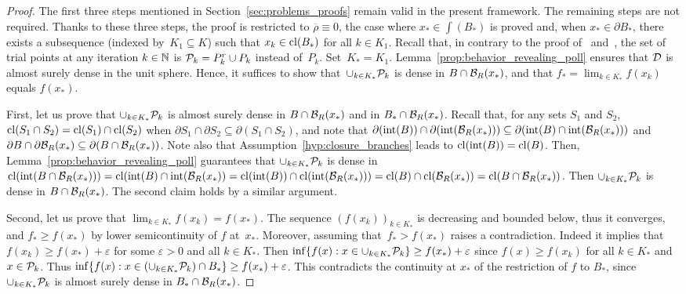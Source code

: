 \begin{proof}
	The first three steps mentioned in Section~\ref{sec:problems_proofs} remain valid in the present framework.
    The remaining steps are not required.
	Thanks to these three steps, the proof is restricted to $\overline{\rho} \equiv 0$, the case where $x_* \in \int(B_*)$ is proved and, when $x_* \in \partial B_*$, there exists a subsequence (indexed by~$K_1 \subseteq K$) such that $x_k \in \cl(B_*)$ for all $k \in K_1$.
	Recall that, in contrary to the proof of~\cite[Theorem~4.1]{ViCu2012} and~\cite[Corollary~4.1]{ViCu2012}, the set of trial points at any iteration $k \in \N$ is $\P_k = P^r_k \cup P_k$ instead of~$P_k$.
    Set~$K_* = K_1$.
	Lemma~\ref{prop:behavior_revealing_poll} ensures that $\D$ is almost surely dense in the unit sphere.
    Hence, it suffices to show that~$\cup_{k \in K_*}\P_k$ is dense in $B \cap \B_R(x_*)$, and that $f_* = \lim_{k \in K_*} f(x_k)$ equals $f(x_*)$.
    
    First, let us prove that $\cup_{k \in K_*}\P_k$ is almost surely dense in $B \cap \B_R(x_*)$ and in $B_* \cap \B_R(x_*)$.
    Recall that, for any sets $S_1$ and $S_2$, $\cl(S_1 \cap S_2) = \cl(S_1) \cap \cl(S_2)$ when $\partial S_1 \cap \partial S_2 \subseteq \partial(S_1 \cap S_2)$, and note that $\partial(\int(B)) \cap \partial(\int(\B_R(x_*))) \subseteq \partial(\int(B) \cap\int(\B_R(x_*)))$ and $\partial B \cap \partial \B_R(x_*) \subseteq \partial(B \cap \B_R(x_*))$.
    Note also that Assumption~\ref{hyp:closure_branches} leads to $\cl(\int(B)) = \cl(B)$.
    Then, Lemma~\ref{prop:behavior_revealing_poll} guarantees that $\cup_{k \in K_*} \P_k$ is dense in $\cl(\int(B \cap \B_R(x_*))) = \cl(\int(B) \cap \int(\B_R(x_*)) = \cl(\int(B)) \cap \cl(\int(\B_R(x_*))) = \cl(B) \cap \cl(\B_R(x_*)) = \cl(B \cap \B_R(x_*))$.
    Then $\cup_{k \in K_*} \P_k$ is dense in $B \cap \B_R(x_*)$.
    The second claim holds by a similar argument.
    
	Second, let us prove that $\lim_{k \in K_*}f(x_k) = f(x_*)$.
    The sequence $(f(x_k))_{k \in K_*}$ is decreasing and bounded below, thus it converges, and $f_* \geq f(x_*)$ by lower semicontinuity of $f$ at~$x_*$.
	Moreover, assuming that~$f_* > f(x_*)$ raises a contradiction.
	Indeed it implies that $f(x_k) \geq f(x_*) +\varepsilon$ for some $\varepsilon > 0$ and all $k \in K_*$.
	Then $\inf\{f(x) : x \in \cup_{k \in K_*} \P_k\} \geq f(x_*) + \varepsilon$ since $f(x) \geq f(x_k)$ for all $k \in K_*$ and $x \in \P_k$.
	Thus $\inf\{f(x) : x \in (\cup_{k \in K_*} \P_k) \cap B_*\} \geq f(x_*) + \varepsilon$.
	This contradicts the continuity at $x_*$ of the restriction of $f$ to $B_*$, since $\cup_{k \in K_*} \P_k$ is almost surely dense in $B_* \cap \B_R(x_*)$.
\end{proof}

